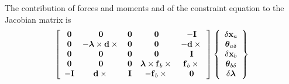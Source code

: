 \documentclass[10pt,dvips,fleqn,subeqn]{report}
\newcommand{\T}[1]{\bm{\mathbf{#1}}}
\begin{document}
The contribution of forces and moments and of the constraint equation 
to the Jacobian matrix is
\begin{equation}
	\sqbr{\matr{ccccc}{
		\T{0} & \T{0} & \T{0} & \T{0} & - \T{I} \\
		\T{0} & - \T{\lambda}\times\T{d}\times{} & \T{0} & \T{0} & - \T{d}\times{}\\
		\T{0} & \T{0} & \T{0} & \T{0} & \T{I} \\
		\T{0} & \T{0} & \T{0} & \T{\lambda}\times\T{f}_b\times{} & \T{f}_b\times{} \\
		- \T{I} & \T{d}\times{} & \T{I} & - \T{f}_b\times{} & \T{0}
	}}\cubr{\cvvect{
		\delta\T{x}_a \\
		\T{\theta}_{a\delta} \\
		\delta\T{x}_b \\
		\T{\theta}_{b\delta} \\
		\delta\T{\lambda}
	}}
\end{equation}
\end{document}
